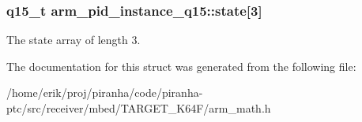 \subsubsection[{\texorpdfstring{state}{state}}]{\setlength{\rightskip}{0pt plus 5cm}q15\+\_\+t arm\+\_\+pid\+\_\+instance\+\_\+q15\+::state\mbox{[}3\mbox{]}}\hypertarget{structarm__pid__instance__q15_a4a3f0a878b5b6b055e3478a2f244cd30}{}\label{structarm__pid__instance__q15_a4a3f0a878b5b6b055e3478a2f244cd30}
The state array of length 3. 

The documentation for this struct was generated from the following file\+:\begin{DoxyCompactItemize}
\item 
/home/erik/proj/piranha/code/piranha-\/ptc/src/receiver/mbed/\+T\+A\+R\+G\+E\+T\+\_\+\+K64\+F/arm\+\_\+math.\+h\end{DoxyCompactItemize}
